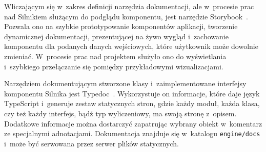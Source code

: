 Wliczającym się w~zakres definicji narzędzia dokumentacji, ale w~procesie prac nad Silnikiem służącym do podglądu komponentu, jest narzędzie Storybook~\cite{Storybook}. Pozwala ono na szybkie prototypowanie komponentów aplikacji, tworzenie dynamicznej dokumentacji, prezentującej na żywo wygląd i~zachowanie komponentu dla podanych danych wejściowych, które użytkownik może dowolnie zmieniać. W~procesie prac nad projektem służyło ono do wyświetlania i~szybkiego przełączanie się pomiędzy przykładowymi wizualizacjami.

Narzędziem dokumentującym stworzone klasy i~zaimplementowane interfejsy komponentu Silnika jest Typedoc~\cite{Typedoc}. Wykorzystuje on informacje, które daje język TypeScript i~generuje zestaw statycznych stron, gdzie każdy moduł, każda klasa, czy też każdy interfejs, bądź typ wyliczeniowy, ma swoją stronę z~opisem. Dodatkowe informacje można dostarczyć zapatrując wybrany obiekt w~komentarz ze specjalnymi adnotacjami. Dokumentacja znajduje się w~katalogu \texttt{engine/docs} i~może być serwowana przez serwer plików statycznych.
